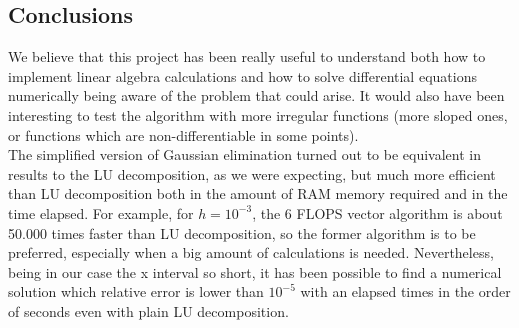 \documentclass[10pt,a4paper,titlepage]{article}
\begin{document}
\subsection*{Conclusions}
We believe that this project has been really useful to understand both how to implement linear algebra calculations and how to solve differential equations numerically being aware of the problem that could arise. It would also have been interesting to test the algorithm with more irregular functions (more sloped ones, or functions which are non-differentiable in some points).\\
The simplified version of Gaussian elimination turned out to be equivalent in results to the LU decomposition, as we were expecting, but much more efficient than LU decomposition both in the amount of RAM memory required and in the time elapsed. For example, for $h=10^{-3}$, the 6 FLOPS vector algorithm is about 50.000 times faster than LU decomposition, so the former algorithm is to be preferred, especially when a big amount of calculations is needed.
Nevertheless, being in our case the x interval so short, it has been possible to find a numerical solution which relative error is lower than $10^{-5}$ with an elapsed times in the order of seconds even with plain LU decomposition.
\end{document}
